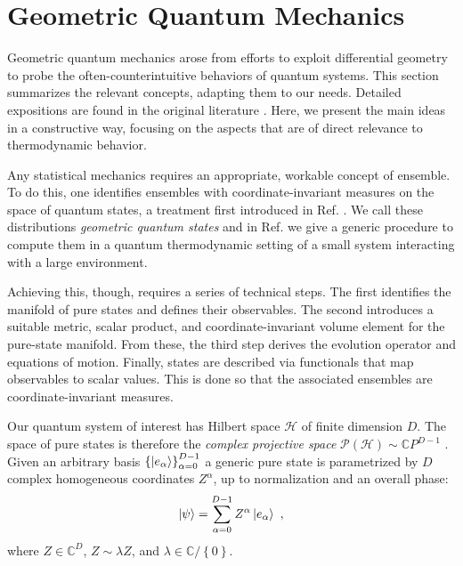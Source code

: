 \documentclass[draft,nofootinbib,pre,twocolumn,showpacs,showkeys,groupaddress,preprintnumbers,floatfix]{revtex4-1}
\newcommand{\1}{\mathbbm{1}}
\begin{document}
\section{Geometric Quantum Mechanics}
\label{sec:GQM}

Geometric quantum mechanics arose from efforts to exploit differential geometry
to probe the often-counterintuitive behaviors of quantum systems. This section
summarizes the relevant concepts, adapting them to our needs. Detailed
expositions are found in the original literature
\cite{STROCCHI1966,Kibble1979,Chern76a,Hugh95,Heslot1985,Gibbons1992,Ashtekar1995,Ashtekar1999,Brody2001,Bengtsson2017,Carinena2007,Chruscinski2006,Marmo2010,Avron2020,Pastorello2015,Pastorello2015a,Pastorello2016,Clemente-Gallardo2013}. Here, we present the main ideas in a constructive way, focusing on the aspects
that are of direct relevance to thermodynamic behavior.

Any statistical mechanics requires an appropriate, workable concept of
ensemble. To do this, one identifies ensembles with coordinate-invariant
measures on the space of quantum states, a treatment first introduced in Ref.
\cite{Brody1998}. We call these distributions \emph{geometric quantum states}
and in Ref. \cite{Anza20a} we give a generic procedure to compute them in a
quantum thermodynamic setting of a small system interacting with a large
environment.

Achieving this, though, requires a series of technical steps. The first
identifies the manifold of pure states and defines their observables. The
second introduces a suitable metric, scalar product, and coordinate-invariant
volume element for the pure-state manifold. From these, the third step derives
the evolution operator and equations of motion. Finally, states are described
via functionals that map observables to scalar values. This is done so that the
associated ensembles are coordinate-invariant measures.

Our quantum system of interest has Hilbert space $\mathcal{H}$ of finite
dimension $D$. The space of pure states is therefore the \emph{complex projective
space} $\mathcal{P}\left( \mathcal{H} \right) \sim \mathbb{C}P^{D-1}$
\cite{Bengtsson2017}.  Given an arbitrary basis $\left\{\ket{e_\alpha}
\right\}_{\alpha=0}^{D-1}$ a generic pure state is parametrized by $D$
complex homogeneous coordinates $Z^\alpha$, up to normalization and an overall
phase:
\begin{align*}
\ket{\psi} = \sum_{\alpha=0}^{D-1} Z^\alpha \ket{e_\alpha}
  ~,
\end{align*}
where $Z \in \mathbb{C}^{D}$, $Z \sim \lambda Z$, and $\lambda \in
\mathbb{C}/\left\{ 0\right\}$.
\end{document}

